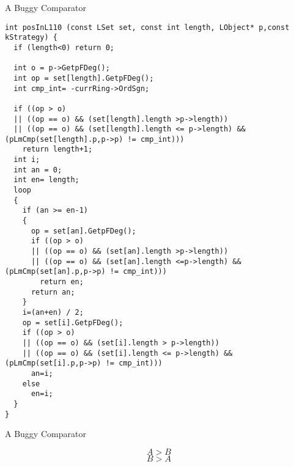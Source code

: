 \documentclass[11pt]{beamer}
\begin{document}
\begin{frame}[fragile]{A Buggy Comparator}
\tiny\begin{verbatim}
int posInL110 (const LSet set, const int length, LObject* p,const kStrategy) {
  if (length<0) return 0;

  int o = p->GetpFDeg();
  int op = set[length].GetpFDeg();
  int cmp_int= -currRing->OrdSgn;

  if ((op > o)
  || ((op == o) && (set[length].length >p->length))
  || ((op == o) && (set[length].length <= p->length) && (pLmCmp(set[length].p,p->p) != cmp_int)))
    return length+1;
  int i;
  int an = 0;
  int en= length;
  loop
  {
    if (an >= en-1)
    {
      op = set[an].GetpFDeg();
      if ((op > o)
      || ((op == o) && (set[an].length >p->length))
      || ((op == o) && (set[an].length <=p->length) && (pLmCmp(set[an].p,p->p) != cmp_int)))
        return en;
      return an;
    }
    i=(an+en) / 2;
    op = set[i].GetpFDeg();
    if ((op > o)
    || ((op == o) && (set[i].length > p->length))
    || ((op == o) && (set[i].length <= p->length) && (pLmCmp(set[i].p,p->p) != cmp_int)))
      an=i;
    else
      en=i;
  }
}
\end{verbatim}
\end{frame}

\begin{frame}{A Buggy Comparator}
\centering
{}
\[ A > B \]
\[ B > A \]

\end{frame}
\end{document}
